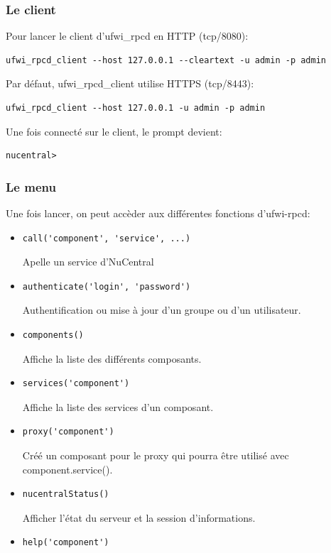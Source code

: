 \documentclass[12pt]{report}
\begin{document}
\begin{itemize}
\subsubsection{Le client}
Pour lancer le client d'ufwi\_rpcd en HTTP (tcp/8080):
\begin{verbatim}ufwi_rpcd_client --host 127.0.0.1 --cleartext -u admin -p admin\end{verbatim}
Par défaut, ufwi\_rpcd\_client utilise HTTPS (tcp/8443):
\begin{verbatim}ufwi_rpcd_client --host 127.0.0.1 -u admin -p admin\end{verbatim}
Une fois connecté sur le client, le prompt devient: 
\begin{verbatim}nucentral>\end{verbatim}

\subsubsection{Le menu}
Une fois lancer, on peut accèder aux différentes fonctions d'ufwi-rpcd:
\begin{itemize}
  \item \begin{verbatim}call('component', 'service', ...)\end{verbatim}
  Apelle un service d'NuCentral
  \item \begin{verbatim}authenticate('login', 'password')\end{verbatim}
  Authentification ou mise à jour d'un groupe ou d'un utilisateur.
  \item \begin{verbatim}components()\end{verbatim}
  Affiche la liste des différents composants.
  \item \begin{verbatim}services('component')\end{verbatim}
  Affiche la liste des services d'un composant.
  \item \begin{verbatim}proxy('component')\end{verbatim}
  Créé un composant pour le proxy qui pourra être utilisé avec component.service().
  \item \begin{verbatim}nucentralStatus()\end{verbatim}
  Afficher l'état du serveur et la session d'informations.
  \item \begin{verbatim}help('component')\end{verbatim}

\end{itemize}
\end{itemize}
\end{document}
